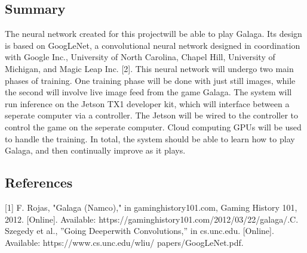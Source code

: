\documentclass[onecolumn, draftclsnofoot,10pt, compsoc]{IEEEtran}
\begin{document}
\subsection{Summary}

The neural network created for this projectwill be able to play Galaga. Its design is based on GoogLeNet, a convolutional
neural network designed in coordination with Google Inc., University of North Carolina, Chapel Hill, University of
Michigan, and Magic Leap Inc. [2]. This neural network will undergo two main phases of training. One training phase
will be done with just still images, while the second will involve live image feed from the game Galaga. The system will
run inference on the Jetson TX1 developer kit, which will interface between a seperate computer via a controller. The
Jetson will be wired to the controller to control the game on the seperate computer. Cloud computing GPUs will be used
to handle the training. In total, the system should be able to learn how to play Galaga, and then continually improve as
it plays.

\subsection{References}

[1] F. Rojas, "Galaga (Namco)," in gaminghistory101.com, Gaming History 101, 2012. [Online]. Available: https://gaminghistory101.com/2012/03/22/galaga/.\newline
[2] C. Szegedy et al., ”Going Deeperwith Convolutions,” in cs.unc.edu. [Online]. Available: https://www.cs.unc.edu/wliu/
papers/GoogLeNet.pdf.
\end{document}
